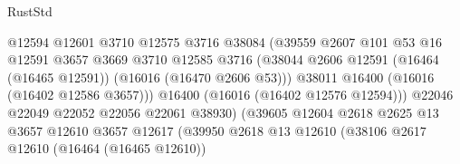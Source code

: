 \begin{lexlean}{RustStd}
\begin{coremodule}
                                            @12594
                                            @12601
                                            @3710
                                            @12575
                                            @3716
                                            @38084
                                            (@39559
                                              @2607
                                              @101
                                              @53
                                              @16
                                              @12591
                                              @3657
                                              @3669
                                              @3710
                                              @12585
                                              @3716
                                              (@38044
                                                @2606
                                                @12591
                                                (@16464 (@16465 @12591))
                                                (@16016 (@16470 @2606 @53)))
                                              @38011
                                              @16400
                                              (@16016 (@16402 @12586 @3657)))
                                            @16400
                                            (@16016 (@16402 @12576 @12594)))
                                          @22046
                                          @22049
                                          @22052
                                          @22056
                                          @22061
                                          @38930)
                                        (@39605
                                          @12604
                                          @2618
                                          @2625
                                          @13
                                          @3657
                                          @12610
                                          @3657
                                          @12617
                                          (@39950
                                            @2618
                                            @13
                                            @12610
                                            (@38106
                                              @2617
                                              @12610
                                              (@16464 (@16465 @12610))

\end{coremodule}
\end{lexlean}

